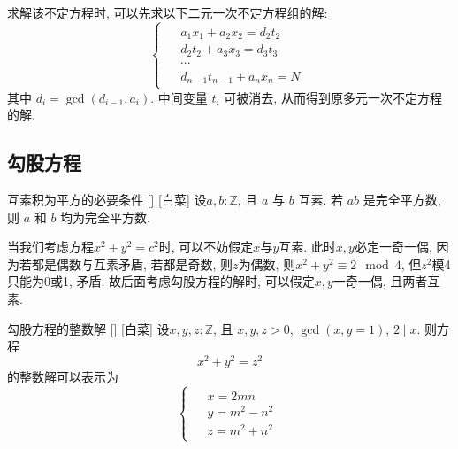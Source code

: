 \documentclass[UTF8]{ctexart}
\begin{document}
            \begin{rmk}
                    求解该不定方程时, 可以先求以下二元一次不定方程组的解:
                    \[
                        \begin{cases}
                        \begin{aligned}
                            &a_1x_1+a_2x_2=d_2t_2\\
                            &d_2t_2+a_3x_3=d_3t_3\\
                            &\cdots\\
                            &d_{n-1}t_{n-1}+a_nx_n=N
                        \end{aligned}
                        \end{cases} 
                    \]
                    其中 \(d_i=\gcd(d_{i-1}, a_i)\). 中间变量 \(t_i\) 可被消去, 从而得到原多元一次不定方程的解.
            \end{rmk}
        \subsection{勾股方程}
            \begin{lma}
            [CoprimeProductIsSquareNecessaryCondition]
            {互素积为平方的必要条件}
            []
            [白菜]
            设\(a, b:\mathbb{Z}\), 且 \(a\) 与 \(b\) 互素. 若 \(ab\) 是完全平方数, 则 \(a\) 和 \(b\) 均为完全平方数.
            \end{lma}

            \begin{rmk}
                当我们考虑方程\(x^2+y^2=c^2\)时, 可以不妨假定\(x\)与\(y\)互素. 此时\(x,y\)必定一奇一偶, 因为若都是偶数与互素矛盾, 若都是奇数, 则\(z\)为偶数, 
                则\(x^2+y^2\equiv 2\mod 4\), 但$z^2$模4只能为0或1, 矛盾. 故后面考虑勾股方程的解时, 可以假定\(x,y\)一奇一偶, 且两者互素.
            \end{rmk}

            \begin{thm}
            [InternalSolutionsOfPythagoreanEquation]
            {勾股方程的整数解}
            []
            [白菜]
            设\(x, y, z:\mathbb{Z}\), 且 \(x, y, z>0\), \(\gcd(x,y=1)\), \(2\mid x\). 则方程
            \[x^2+y^2=z^2\]
            的整数解可以表示为
            \[
                \begin{cases}
                \begin{aligned}
                    &x=2mn\\
                    &y=m^2-n^2\\
                    &z=m^2+n^2
                \end{aligned}
                \end{cases}
            \]

            \end{thm}
            
\end{document}
